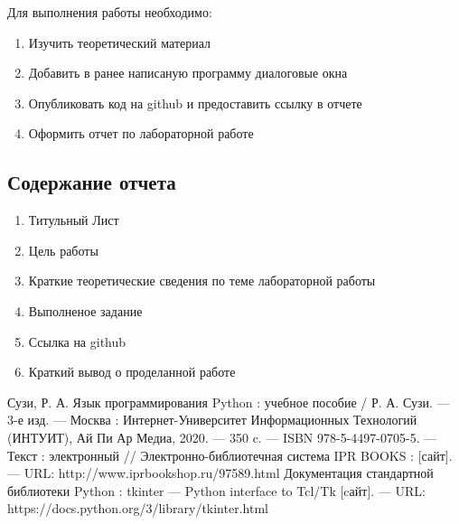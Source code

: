 \documentclass[a4paper]{article}
\begin{document}
Для выполнения работы необходимо:
\begin{enumerate}
  \item Изучить теоретический материал
  \item Добавить в ранее написаную программу диалоговые окна
  \item Опубликовать код на github и предоставить ссылку в отчете
  \item Оформить отчет по лабораторной работе
\end{enumerate}

\subsection{Содержание отчета}
\begin{enumerate}
  \item Титульный Лист
  \item Цель работы
  \item Краткие теоретические сведения по теме лабораторной работы
  \item Выполненое задание
  \item Ссылка на github
  \item Краткий вывод о проделанной работе
\end{enumerate}

\begin{thebibliography}{3}
  Сузи, Р. А. Язык программирования Python : учебное пособие / Р. А. Сузи. — 3-е изд. — Москва : Интернет-Университет Информационных Технологий (ИНТУИТ), Ай Пи Ар Медиа, 2020. — 350 c. — ISBN 978-5-4497-0705-5. — Текст : электронный // Электронно-библиотечная система IPR BOOKS : [сайт]. — URL: http://www.iprbookshop.ru/97589.html
   Документация стандартной библиотеки Python : tkinter — Python interface to Tcl/Tk [cайт]. --- URL: https://docs.python.org/3/library/tkinter.html
\end{thebibliography}
\end{document}

